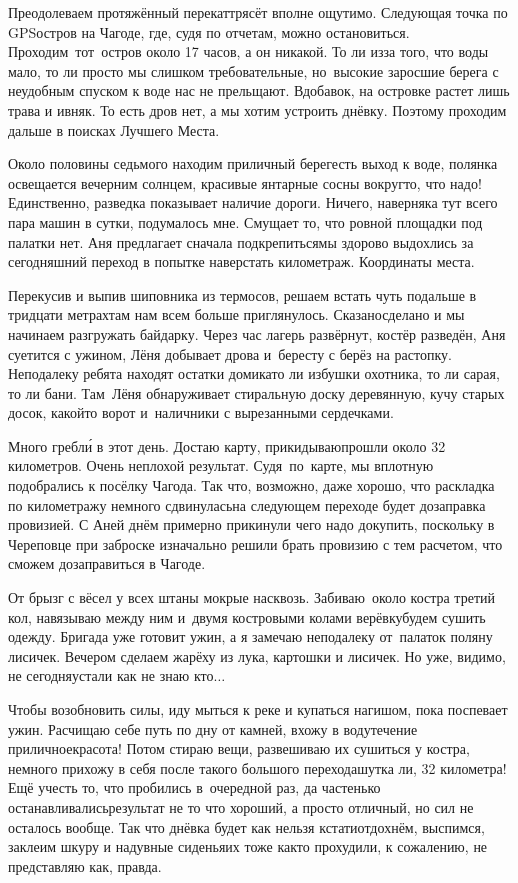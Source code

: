 Преодолеваем протяжённый перекат\mdash трясёт вполне ощутимо. Следующая точка по GPS\mdash остров на Чагоде, где, судя по отчетам, можно остановиться. Проходим~тот~остров около 17 часов, а он никакой. То ли из\sdash за того, что воды мало, то ли просто мы слишком требовательные, но~высокие заросшие берега с неудобным спуском к воде нас не прельщают. Вдобавок, на островке растет лишь трава и ивняк. То есть дров нет, а мы хотим устроить днёвку. Поэтому проходим дальше в поисках Лучшего Места.

 Около половины седьмого находим приличный берег\mdash есть выход к воде, полянка освещается вечерним солнцем, красивые янтарные сосны вокруг\mdash то, что надо! Единственно, разведка показывает наличие дороги. Ничего, наверняка тут всего пара машин в сутки, подумалось мне. Смущает то, что ровной площадки под палатки нет. Аня предлагает сначала подкрепиться\mdash мы здорово выдохлись за сегодняшний переход в попытке наверстать километраж. Координаты места.

Перекусив и выпив шиповника из термосов, решаем встать чуть подальше в тридцати метрах\mdash там нам всем больше приглянулось. Сказано\sdash сделано и мы начинаем разгружать байдарку. Через час лагерь развёрнут, костёр разведён, Аня суетится с ужином, Лёня добывает дрова и~бересту с берёз на растопку. 
\newpage 
Неподалеку ребята находят остатки домика\mdash то ли избушки охотника, то ли сарая, то ли бани. Там~Лёня обнаруживает стиральную доску деревянную, кучу старых досок, какой\sdash то ворот и~наличники с вырезанными сердечками. 

Много гребл\'{и} в этот день. Достаю карту, прикидываю\mdash прошли около 32 километров. Очень неплохой результат. Судя~по~карте, мы вплотную подобрались к посёлку Чагода. Так что, возможно, даже хорошо, что раскладка по километражу немного сдвинулась\mdash на следующем переходе будет дозаправка провизией. С Аней днём примерно прикинули чего надо докупить, поскольку в Череповце при заброске изначально решили брать провизию с тем расчетом, что сможем дозаправиться в Чагоде.

От брызг с вёсел у всех штаны мокрые насквозь. Забиваю~около костра третий кол, навязываю между ним и~двумя костровыми колами верёвку\mdash будем сушить одежду. Бригада уже готовит ужин, а я замечаю неподалеку от~палаток поляну лисичек. Вечером сделаем жарёху из лука, картошки и лисичек. Но уже, видимо, не сегодня\mdash устали как не знаю кто$\ldots$ 

Чтобы возобновить силы, иду мыться к реке и купаться нагишом, пока поспевает ужин. Расчищаю себе путь по дну от камней, вхожу в воду\mdash течение приличное\mdash красота! Потом стираю вещи, развешиваю их сушиться у костра, немного прихожу в себя после такого большого перехода\mdash шутка ли, 32 километра! Ещё учесть то, что пробились в~очередной раз, да частенько останавливались\mdash результат не то что хороший, а просто отличный, но сил не осталось вообще. Так что днёвка будет как нельзя кстати\mdash отдохнём, выспимся, заклеим шкуру и надувные сиденья\mdash их тоже как\sdash то прохудили, к сожалению, не представляю как, правда.

